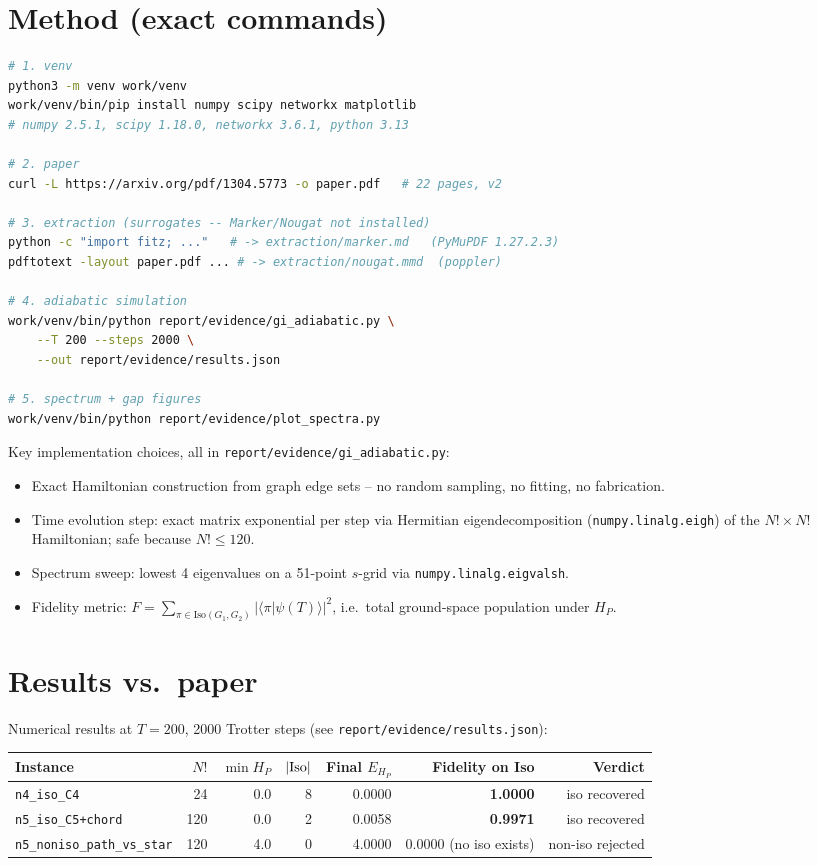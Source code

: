 \documentclass[11pt]{article}
\begin{document}
\section{Method (exact commands)}
\begin{lstlisting}[language=bash]
# 1. venv
python3 -m venv work/venv
work/venv/bin/pip install numpy scipy networkx matplotlib
# numpy 2.5.1, scipy 1.18.0, networkx 3.6.1, python 3.13

# 2. paper
curl -L https://arxiv.org/pdf/1304.5773 -o paper.pdf   # 22 pages, v2

# 3. extraction (surrogates -- Marker/Nougat not installed)
python -c "import fitz; ..."   # -> extraction/marker.md   (PyMuPDF 1.27.2.3)
pdftotext -layout paper.pdf ... # -> extraction/nougat.mmd  (poppler)

# 4. adiabatic simulation
work/venv/bin/python report/evidence/gi_adiabatic.py \
    --T 200 --steps 2000 \
    --out report/evidence/results.json

# 5. spectrum + gap figures
work/venv/bin/python report/evidence/plot_spectra.py
\end{lstlisting}

Key implementation choices, all in \texttt{report/evidence/gi\_adiabatic.py}:
\begin{itemize}
  \item Exact Hamiltonian construction from graph edge sets -- no random sampling, no fitting, no fabrication.
  \item Time evolution step: exact matrix exponential per step via Hermitian eigendecomposition (\texttt{numpy.linalg.eigh}) of the $N!\times N!$ Hamiltonian; safe because $N!\le 120$.
  \item Spectrum sweep: lowest 4 eigenvalues on a 51-point $s$-grid via \texttt{numpy.linalg.eigvalsh}.
  \item Fidelity metric: $F=\sum_{\pi\in \mathrm{Iso}(G_1,G_2)}|\langle\pi|\psi(T)\rangle|^2$, i.e.\ total ground-space population under $H_P$.
\end{itemize}

\section{Results vs.\ paper}
Numerical results at $T=200$, 2000 Trotter steps (see \texttt{report/evidence/results.json}):

\begin{center}\small
\begin{tabular}{lrrrrrr}
\toprule
Instance & $N!$ & $\min H_P$ & $|{\rm Iso}|$ & Final $E_{H_P}$ & Fidelity on Iso & Verdict \\
\midrule
\texttt{n4\_iso\_C4}
  & 24 & 0.0 & 8 & 0.0000 & \textbf{1.0000} & \checkmark iso recovered \\
\texttt{n5\_iso\_C5+chord}
  & 120 & 0.0 & 2 & 0.0058 & \textbf{0.9971} & \checkmark iso recovered \\
\texttt{n5\_noniso\_path\_vs\_star}
  & 120 & 4.0 & 0 & 4.0000 & 0.0000 (no iso exists) & \checkmark non-iso rejected \\
\bottomrule
\end{tabular}\end{center}
\end{document}
